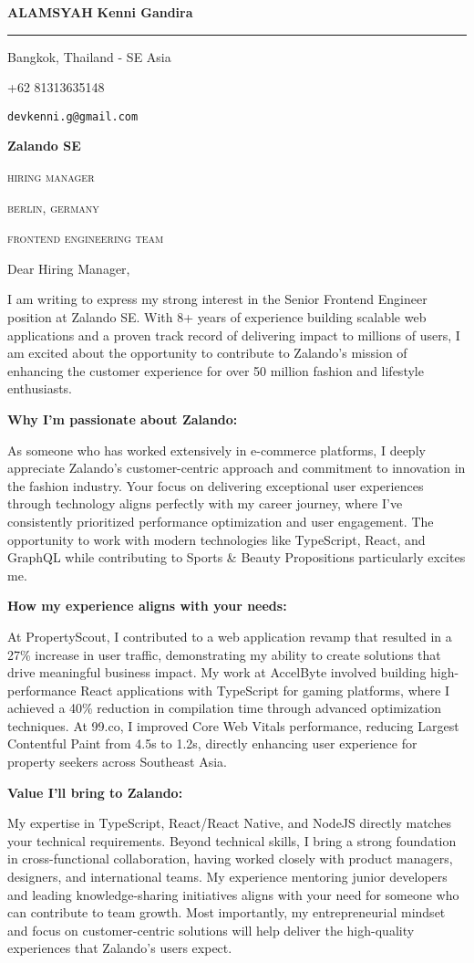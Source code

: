 \documentclass[12pt]{article}
\newcommand{\mainColor}{redBlood} %
\newlength{\spacebox}
\newcommand{\shspace}{\hspace*{0.8em}}
\newcommand{\xvspace}{\vspace*{0.1em}}
\newcommand{\svspace}{\vspace*{0.5em}}
\newcommand{\mvspace}{\vspace*{1.5em}}
\newcommand{\hvspace}{\vspace*{2.5em}}
\newcommand{\negmvspace}{\vspace*{-1em}}
\newcommand{\userInfo}[4]{
    \begin{flushleft}
        \color{\mainColor}
        \Huge
        \textbf{\MakeUppercase{ALAMSYAH}}
        \color{black}
        \textbf{Kenni Gandira}
        \color{\mainColor}
        \noindent\rule{19.1cm}{0.8pt}
        \color{grayShy}
        \small
        \par
        \parbox{7\spacebox} {
            \faMap \shspace #1 - #2 \par \svspace
            \faPhone \shspace #3 \par \svspace
            \faEnvelopeOpen \shspace \texttt{#4} \par \svspace
        }
        \color{\mainColor}
        \mvspace
    \end{flushleft}
    \negmvspace
}
\newcommand{\companyInfo}[4]{
    \begin{flushright}
        \parbox{4\spacebox}{
            \raggedleft
            \small
            \textbf{#1}\par
            \mvspace
            \color{grayShy} \textsc{\MakeLowercase{#2}}\par
            \xvspace
            \textsc{\MakeLowercase{#3}}\par
            \xvspace
            \textsc{\MakeLowercase{#4}}\par
            \color{black}
        }
    \end{flushright}
}
\begin{document}
\userInfo{Bangkok, Thailand}{SE Asia}{+62 81313635148}{devkenni.g@gmail.com}

\companyInfo{Zalando SE}{Hiring Manager}{Berlin, Germany}{Frontend Engineering Team}

\hvspace

Dear Hiring Manager,

I am writing to express my strong interest in the Senior Frontend Engineer position at Zalando SE. With 8+ years of experience building scalable web applications and a proven track record of delivering impact to millions of users, I am excited about the opportunity to contribute to Zalando's mission of enhancing the customer experience for over 50 million fashion and lifestyle enthusiasts.

\textbf{Why I'm passionate about Zalando:}

As someone who has worked extensively in e-commerce platforms, I deeply appreciate Zalando's customer-centric approach and commitment to innovation in the fashion industry. Your focus on delivering exceptional user experiences through technology aligns perfectly with my career journey, where I've consistently prioritized performance optimization and user engagement. The opportunity to work with modern technologies like TypeScript, React, and GraphQL while contributing to Sports \& Beauty Propositions particularly excites me.

\textbf{How my experience aligns with your needs:}

At PropertyScout, I contributed to a web application revamp that resulted in a 27\% increase in user traffic, demonstrating my ability to create solutions that drive meaningful business impact. My work at AccelByte involved building high-performance React applications with TypeScript for gaming platforms, where I achieved a 40\% reduction in compilation time through advanced optimization techniques. At 99.co, I improved Core Web Vitals performance, reducing Largest Contentful Paint from 4.5s to 1.2s, directly enhancing user experience for property seekers across Southeast Asia.

\textbf{Value I'll bring to Zalando:}

My expertise in TypeScript, React/React Native, and NodeJS directly matches your technical requirements. Beyond technical skills, I bring a strong foundation in cross-functional collaboration, having worked closely with product managers, designers, and international teams. My experience mentoring junior developers and leading knowledge-sharing initiatives aligns with your need for someone who can contribute to team growth. Most importantly, my entrepreneurial mindset and focus on customer-centric solutions will help deliver the high-quality experiences that Zalando's users expect.
\end{document}
